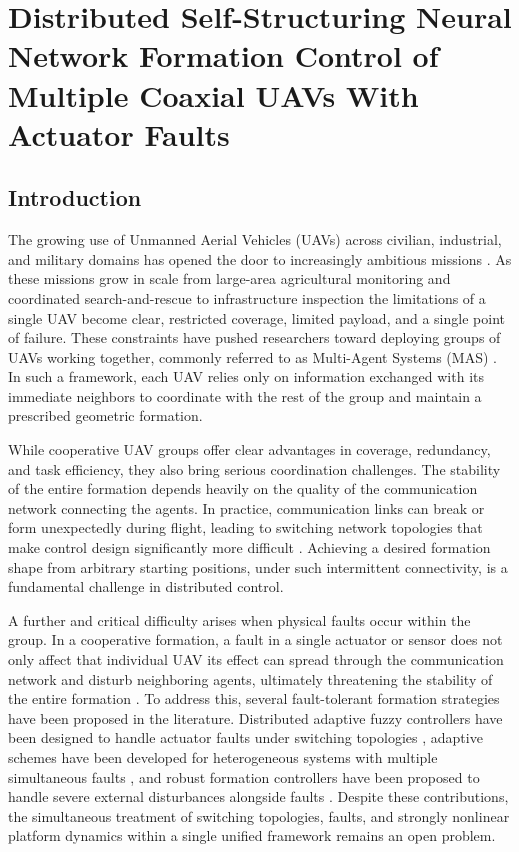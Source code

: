 \chapter{Distributed Self-Structuring Neural Network Formation Control of Multiple Coaxial UAVs With Actuator Faults}

\section{Introduction}

The growing use of Unmanned Aerial Vehicles (UAVs) across civilian, industrial,
and military domains has opened the door to increasingly ambitious missions
\cite{UAV_rev, UAV_rev1}. As these missions grow in scale  from large-area
agricultural monitoring and coordinated search-and-rescue to infrastructure
inspection  the limitations of a single UAV become clear, restricted coverage,
limited payload, and a single point of failure. These constraints have pushed
researchers toward deploying groups of UAVs working together, commonly referred
to as Multi-Agent Systems (MAS) \cite{formation_control_rv1, formation_control_rv3}.
In such a framework, each UAV relies only on information exchanged with its
immediate neighbors to coordinate with the rest of the group and maintain a
prescribed geometric formation.

While cooperative UAV groups offer clear advantages in coverage, redundancy, and
task efficiency, they also bring serious coordination challenges. The stability
of the entire formation depends heavily on the quality of the communication
network connecting the agents. In practice, communication links can break or
form unexpectedly during flight, leading to switching network topologies that
make control design significantly more difficult \cite{Switching_Topology_2021}.
Achieving a desired formation shape from arbitrary starting positions, under
such intermittent connectivity, is a fundamental challenge in distributed
control.

A further and critical difficulty arises when physical faults occur within the
group. In a cooperative formation, a fault in a single actuator or sensor does not only
affect that individual UAV  its effect can spread through the communication
network and disturb neighboring agents, ultimately threatening the stability of
the entire formation \cite{formation_control_fault1}. To address this, several
fault-tolerant formation strategies have been proposed in the literature.
Distributed adaptive fuzzy controllers have been designed to handle actuator
faults under switching topologies \cite{formation_control_fault1}, adaptive
schemes have been developed for heterogeneous systems with multiple simultaneous
faults \cite{formation_control_fault2}, and robust formation controllers have
been proposed to handle severe external disturbances alongside faults
\cite{formation_control_fault3}. Despite these contributions, the simultaneous
treatment of switching topologies, faults, and strongly nonlinear
platform dynamics within a single unified framework remains an open problem.


